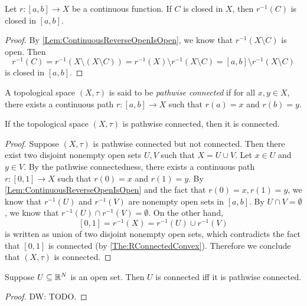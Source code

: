 \documentclass[screen]{techreport}
\numberwithin{equation}{section}
\newcommand{\diw}[1]{{\color{Red} DW: #1}}
\begin{document}
\begin{proposition}\label{Prop:ContinuousReverseClosedIsClosed}
	Let $r : [a,b] \to X$ be a continuous function.
	If $C$ is closed in $X$, then $r^{-1}(C)$ is closed in $[a,b]$.
\end{proposition}
\begin{proof}
	By \cref{Lem:ContinuousReverseOpenIsOpen}, we know that $r^{-1}(X \setminus C)$ is open.
	Then
	\[
	r^{-1}(C) = r^{-1}(X \setminus (X \setminus C)) = r^{-1}(X) \setminus r^{-1}(X \setminus C) = [a,b] \setminus r^{-1}(X\setminus C)
	\]
	is closed in $[a,b]$.
\end{proof}

\begin{definition}\label{De:PathwiseConnected}
	A topological space $(X,\tau)$ is said to be \emph{pathwise connected} if for all $x,y \in X$, there exists a continuous path $r : [a,b] \to X$ such that $r(a) =x$ and $r(b)=y$.
\end{definition}

\begin{proposition}\label{Prop:PathWiseConnImplyConn}
	If the topological space $(X,\tau)$ is pathwise connected, then it is connected.
\end{proposition}
\begin{proof}
	Suppose $(X,\tau)$ is pathwise connected but not connected.
	Then there exist two disjoint nonempty open sets $U,V$ such that $X = U \cup V$.
	Let $x \in U$ and $y \in V$.
	By the pathwise connectedness, there exists a continuous path $r : [0,1] \to X$ such that $r(0)=x$ and $r(1)=y$.
	By \cref{Lem:ContinuousReverseOpenIsOpen} and the fact that $r(0)=x,r(1)=y$, we know that $r^{-1}(U)$ and $r^{-1}(V)$ are nonempty open sets in $[a,b]$.
	By $U \cap V = \emptyset$, we know that $r^{-1}(U) \cap r^{-1}(V) = \emptyset$.
	On the other hand,
	\[
	[0,1] = r^{-1}(X) = r^{-1}(U) \cup r^{-1}(V)
	\]
	is written as union of two disjoint nonempty open sets, which contradicts the fact that $[0,1]$ is connected (by \cref{The:RConnectedConvex}).
	Therefore we conclude that $(X,\tau)$ is connected.
\end{proof}

\begin{proposition}\label{Prop:OpenSetInEuclideanSpaceConn}
	Suppose $U \subseteq \mathbb{R}^N$ is an open set.
	Then $U$ is connected iff it is pathwise connected.
\end{proposition}
\begin{proof}
	\diw{TODO.}
\end{proof}
\end{document}
